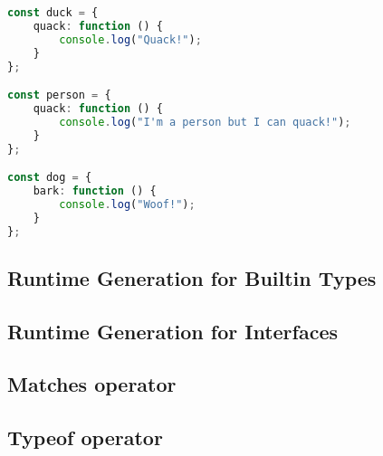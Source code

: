 \begin{lstlisting}[language=Typescript,caption=Example of duck typing in JavaScript,label=lst:implementation:javascriptducktyping]
const duck = {
	quack: function () {
		console.log("Quack!");
	}
};

const person = {
	quack: function () {
		console.log("I'm a person but I can quack!");
	}
};

const dog = {
	bark: function () {
		console.log("Woof!");
	}
};
\end{lstlisting}





\subsection{Runtime Generation for Builtin Types}

\subsection{Runtime Generation for Interfaces}

\subsection{Matches operator}

\subsection{Typeof operator}
